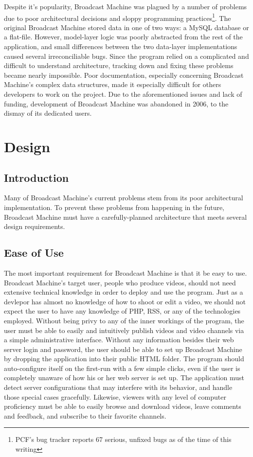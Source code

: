 \documentclass[a4paper,12pt]{report}
\begin{document}
Despite it's popularity, Broadcast Machine was plagued by a number of problems due to poor architectural decisions and sloppy programming practices\footnote{PCF's bug tracker reports 67 serious, unfixed bugs as of the time of this writing}. The original Broadcast Machine stored data in one of two ways: a MySQL database or a flat-file. However, model-layer logic was poorly abstracted from the rest of the application, and small differences between the two data-layer implementations caused several irreconciliable bugs. Since the program relied on a complicated and difficult to understand architecture, tracking down and fixing these problems became nearly impossible. Poor documentation, especially concerning Broadcast Machine's complex data structures, made it especially difficult for others developers to work on the project. Due to the aforementioned issues and lack of funding, development of Broadcast Machine was abandoned in 2006, to the dismay of its dedicated users.

\chapter{Design}

\section{Introduction}
Many of Broadcast Machine's current problems stem from its poor architectural implementation. 
To prevent these problems from happening in the future, Broadcast Machine must have a carefully-planned architecture that meets several design requirements.

\section{Ease of Use}
The most important requirement for Broadcast Machine is that it be easy to use. 
Broadcast Machine's target user, people who produce videos, should not need extensive technical knowledge in order to deploy and use the program. 
Just as a devlepor has almost no knowledge of how to shoot or edit a video, we should not expect the user to have any knowledge of PHP, RSS, or any of the technologies employed. 
Without being privy to any of the inner workings of the program, the user must be able to easily and intuitively publish videos and video channels via a simple administrative interface. 
Without any information besides their web server login and password, the user should be able to set up Broadcast Machine by dropping the application into their public HTML folder. 
The program should auto-configure itself on the first-run with a few simple clicks, even if the user is completely unaware of how his or her web server is set up. 
The application must detect server configurations that may interfere with its behavior, and handle those special cases gracefully. 
Likewise, viewers with any level of computer proficiency must be able to easily browse and download videos, leave comments and feedback, and subscribe to their favorite channels.
\end{document}
